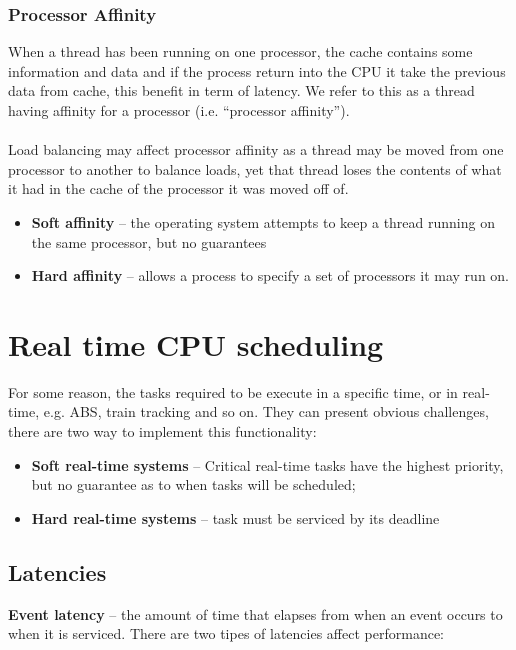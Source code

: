\newpage
\subsubsection{Processor Affinity}
When a thread has been running on one processor, the cache contains some information and data and if the process return into the CPU it take the previous data from cache, this benefit in term of latency. We refer to this as a thread having affinity for a processor (i.e.
“processor affinity”).


\paragraph{}
Load balancing may affect processor affinity as a thread may be moved
from one processor to another to balance loads, yet that thread loses
the contents of what it had in the cache of the processor it was moved
off of.


\begin{itemize}
    \item \textbf{Soft affinity} – the operating system attempts to keep a thread running on the same processor, but no guarantees
    \item \textbf{Hard affinity }– allows a process to specify a set of processors it may run on.
\end{itemize}

\newpage
\section{Real time CPU scheduling}

For some reason, the tasks required to be execute in a specific time, or in real-time, e.g. ABS, train tracking and so on. They can present obvious challenges, there are two way to implement this functionality:

\begin{itemize}
    \item \textbf{Soft real-time systems} – Critical real-time tasks have the highest priority, but no guarantee as to when tasks will be scheduled;
    \item \textbf{Hard real-time systems} – task must be serviced by its deadline
\end{itemize}

\subsection{Latencies}
\textbf{Event latency} – the amount of time that elapses from when an event occurs to when it is serviced. There are two tipes of latencies affect performance: 

